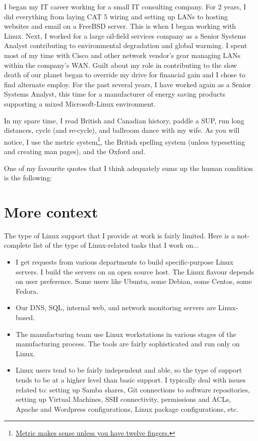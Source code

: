 I began my IT career working for a small IT consulting company. For 2 years, I did everything from laying CAT 5 wiring and setting up LANs to hosting websites and email on a FreeBSD server. This is when I began working with Linux. Next, I worked for a large oil-field services company as a Senior Systems Analyst contributing to environmental degradation and global warming. I spent most of my time with Cisco and other network vendor's gear managing LANs within the company's WAN. Guilt about my role in contributing to the slow death of our planet began to override my drive for financial gain and I chose to find alternate employ. For the past several years, I have worked again as a Senior Systems Analyst, this time for a manufacturer of energy saving products supporting a mixed Microsoft-Linux environment.

In my spare time, I read British and Canadian history, paddle a SUP, run long distances, cycle (and re-cycle), and ballroom dance with my wife. As you will notice, I use the metric system\footnote{\href{http://www.joeydevilla.com/2008/08/13/countries-that-dont-use-the-metric-system/}{Metric makes sense unless you have twelve fingers.}}, the British spelling system (unless typesetting \latex and creating man pages), and the Oxford and.

One of my favourite quotes that I think adequately sums up the human condition is the following: 

\section{More context}

The type of Linux support that I provide at work is fairly limited. Here is a not-complete list of the type of Linux-related tasks that I work on...

\begin{itemize}
	\item {} I get requests from various departments to build specific-purpose Linux servers. I build the servers on an open source host. The Linux flavour depends on user preference. Some users like Ubuntu, some Debian, some Centos, some Fedora.
	\item {} Our DNS, SQL, internal web, and network monitoring servers are Linux-based.
	\item {}The manufacturing team use Linux workstations in various stages of the manufacturing process. The tools are fairly sophisticated and run only on Linux.
	\item {} Linux users tend to be fairly independent and able, so the type of support tends to be at a higher level than basic support. I typically deal with issues related to: setting up Samba shares, Git connections to software repositories, setting up Virtual Machines, SSH connectivity, permissions and ACLs, Apache and Wordpress configurations, Linux package configurations, etc.
\end{itemize}

